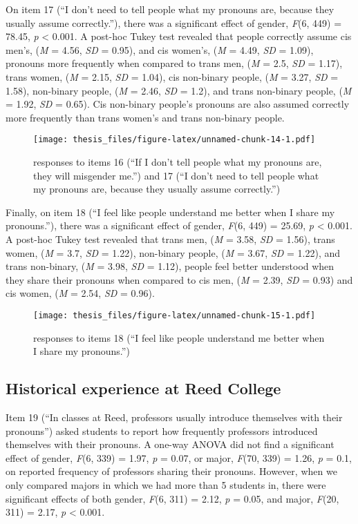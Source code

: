 \documentclass[12pt,twoside]{reedthesis}
\begin{document}
On item 17 (``I don't need to tell people what my pronouns are, because they usually assume correctly.''), there was a significant effect of gender, \emph{F}(6, 449) = 78.45, \emph{p} \textless{} 0.001. A post-hoc Tukey test revealed that people correctly assume cis men's, (\emph{M} = 4.56, \emph{SD} = 0.95), and cis women's, (\emph{M} = 4.49, \emph{SD} = 1.09), pronouns more frequently when compared to trans men, (\emph{M} = 2.5, \emph{SD} = 1.17), trans women, (\emph{M} = 2.15, \emph{SD} = 1.04), cis non-binary people, (\emph{M} = 3.27, \emph{SD} = 1.58), non-binary people, (\emph{M} = 2.46, \emph{SD} = 1.2), and trans non-binary people, (\emph{M} = 1.92, \emph{SD} = 0.65). Cis non-binary people's pronouns are also assumed correctly more frequently than trans women's and trans non-binary people.
\begin{figure}
\centering
\texttt{[image: thesis\_files/figure-latex/unnamed-chunk-14-1.pdf]}
\caption{\label{fig:unnamed-chunk-14}responses to items 16 (``If I don't tell people what my pronouns are, they will misgender me.'') and 17 (``I don't need to tell people what my pronouns are, because they usually assume correctly.'')}
\end{figure}
Finally, on item 18 (``I feel like people understand me better when I share my pronouns.''), there was a significant effect of gender, \emph{F}(6, 449) = 25.69, \emph{p} \textless{} 0.001. A post-hoc Tukey test revealed that trans men, (\emph{M} = 3.58, \emph{SD} = 1.56), trans women, (\emph{M} = 3.7, \emph{SD} = 1.22), non-binary people, (\emph{M} = 3.67, \emph{SD} = 1.22), and trans non-binary, (\emph{M} = 3.98, \emph{SD} = 1.12), people feel better understood when they share their pronouns when compared to cis men, (\emph{M} = 2.39, \emph{SD} = 0.93) and cis women, (\emph{M} = 2.54, \emph{SD} = 0.96).
\begin{figure}
\centering
\texttt{[image: thesis\_files/figure-latex/unnamed-chunk-15-1.pdf]}
\caption{\label{fig:unnamed-chunk-15}responses to items 18 (``I feel like people understand me better when I share my pronouns.'')}
\end{figure}
\hypertarget{historical-experience-at-reed-college}{%
\subsection{Historical experience at Reed College}\label{historical-experience-at-reed-college}}

Item 19 (``In classes at Reed, professors usually introduce themselves with their pronouns'') asked students to report how frequently professors introduced themselves with their pronouns. A one-way ANOVA did not find a significant effect of gender, \emph{F}(6, 339) = 1.97, \emph{p} = 0.07, or major, \emph{F}(70, 339) = 1.26, \emph{p} = 0.1, on reported frequency of professors sharing their pronouns. However, when we only compared majors in which we had more than 5 students in, there were significant effects of both gender, \emph{F}(6, 311) = 2.12, \emph{p} = 0.05, and major, \emph{F}(20, 311) = 2.17, \emph{p} \textless{} 0.001.
\end{document}
